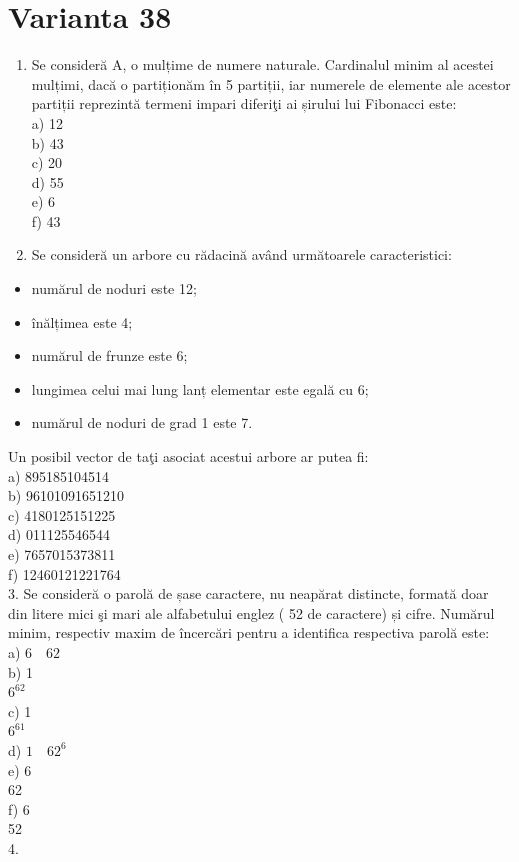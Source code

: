 \documentclass[10pt]{article}
\begin{document}
\section*{Varianta 38}
\begin{enumerate}
  \item Se consideră A, o mulțime de numere naturale. Cardinalul minim al acestei mulțimi, dacă o partiționăm în 5 partiții, iar numerele de elemente ale acestor partiții reprezintă termeni impari diferiţi ai șirului lui Fibonacci este:\\
a) 12\\
b) 43\\
c) 20\\
d) 55\\
e) 6\\
f) 43
  \item Se consideră un arbore cu rădacină având următoarele caracteristici:
\end{enumerate}

\begin{itemize}
  \item numărul de noduri este 12;
  \item înălțimea este 4;
  \item numărul de frunze este 6;
  \item lungimea celui mai lung lanț elementar este egală cu 6;
  \item numărul de noduri de grad 1 este 7.
\end{itemize}

Un posibil vector de taţi asociat acestui arbore ar putea fi:\\
a) 895185104514\\
b) 96101091651210\\
c) 4180125151225\\
d) 011125546544\\
e) 7657015373811\\
f) 12460121221764\\
3. Se consideră o parolă de șase caractere, nu neapărat distincte, formată doar din litere mici şi mari ale alfabetului englez ( 52 de caractere) și cifre. Numărul minim, respectiv maxim de încercări pentru a identifica respectiva parolă este:\\
a) $6 \quad 62$\\
b) 1\\
$6^{62}$\\
c) 1\\
$6^{61}$\\
d) $1 \quad 62^{6}$\\
e) 6\\
62\\
f) 6\\
52\\
4.
\end{document}
